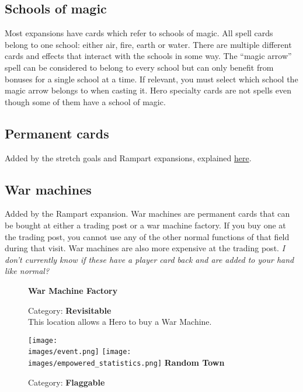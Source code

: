 \subsection*{Schools of magic}
Most expansions have cards which refer to schools of magic.
All spell cards belong to one school: either air, fire, earth or water.
There are multiple different cards and effects that interact with the schools in some way.
The “magic arrow” spell can be considered to belong to every school but can only benefit from bonuses for a single school at a time.
If relevant, you must select which school the magic arrow belongs to when casting it.
Hero specialty cards are not spells even though some of them have a school of magic.
\subsection*{Permanent cards}
Added by the stretch goals and Rampart expansions, explained \hyperlink{Playerdecks}{here}.
\subsection*{War machines}
Added by the Rampart expansion.
War machines are permanent cards that can be bought at either a trading post or a war machine factory.
If you buy one at the trading post, you cannot use any of the other normal functions of that field during that visit.
War machines are also more expensive at the trading post.
\textit{I don't currently know if these have a player card back and are added to your hand like normal?}\par
\begin{wrapfigure}{r}{0.4\textwidth}
  \textbf{War Machine Factory}\\
  \caption{Category: \textbf{Revisitable}\\This location allows a Hero to buy a War Machine.}
\end{wrapfigure}

\clearpage
\begin{wrapfigure}{r}{0.5\textwidth}
    \begin{center}
    \texttt{[image: \\images/event.png]}
    \texttt{[image: \\images/empowered\_statistics.png]}
    \bigbreak
    \textbf{Random Town}
    \smallbreak
    \caption{Category: \textbf{Flaggable}}
    \end{center}
\end{wrapfigure}
